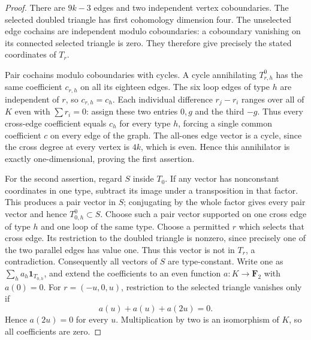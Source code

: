 \begin{proof}
There are $9k-3$ edges and two independent vertex coboundaries.
The selected doubled triangle has first cohomology dimension four.
The unselected edge cochains are independent modulo coboundaries:
a coboundary vanishing on its connected selected triangle is zero.
They therefore give precisely the stated coordinates of $T_r$.

Pair cochains modulo coboundaries with cycles. A cycle annihilating
$T_{r,h}^0$ has the same coefficient $c_{r,h}$ on all its eighteen
edges. The six loop edges of type $h$ are independent of $r$, so
$c_{r,h}=c_h$. Each individual difference $r_j-r_i$ ranges over all
of $K$ even with $\sum r_i=0$: assign these two entries $0,g$ and
the third $-g$. Thus every cross-edge coefficient equals $c_h$ for
every type $h$, forcing a single common coefficient $c$ on every
edge of the graph. The all-ones edge vector is a cycle, since the
cross degree at every vertex is $4k$, which is even. Hence this
annihilator is exactly one-dimensional, proving the first assertion.

For the second assertion, regard $S$ inside $T_0$. If any vector has
nonconstant coordinates in one type, subtract its image under a
transposition in that factor. This produces a pair vector in $S$;
conjugating by the whole factor gives every pair vector and hence
$T_{0,h}^0\subset S$. Choose such a pair vector supported on one
cross edge of type $h$ and one loop of the same type. Choose a
permitted $r$ which selects that cross edge. Its restriction to the
doubled triangle is nonzero, since precisely one of the two parallel
edges has value one. Thus this vector is not in $T_r$, a contradiction.
Consequently all vectors of $S$ are type-constant. Write one as
$\sum_h a_h\mathbf1_{T_{0,h}}$, and extend the coefficients to an
even function $a:K\to\mathbf F_2$ with $a(0)=0$.
For $r=(-u,0,u)$, restriction to the selected triangle vanishes only if
\[
                         a(u)+a(u)+a(2u)=0.
\]
Hence $a(2u)=0$ for every $u$. Multiplication by two is an
isomorphism of $K$, so all coefficients are zero.
\end{proof}

